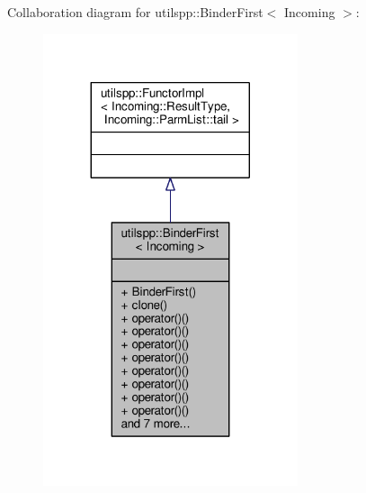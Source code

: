 Collaboration diagram for utilspp\-:\-:Binder\-First$<$ Incoming $>$\-:
\nopagebreak
\begin{figure}[H]
\begin{center}
\leavevmode
\includegraphics[width=212pt]{classutilspp_1_1BinderFirst__coll__graph}
\end{center}
\end{figure}
